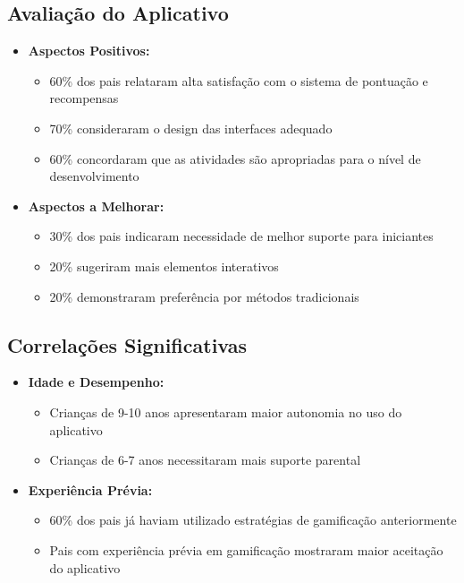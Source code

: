 \subsection{Avaliação do Aplicativo}

\begin{itemize}
    \item \textbf{Aspectos Positivos:}
    \begin{itemize}
        \item 60\% dos pais relataram alta satisfação com o sistema de pontuação e recompensas
        \item 70\% consideraram o design das interfaces adequado
        \item 60\% concordaram que as atividades são apropriadas para o nível de desenvolvimento
    \end{itemize}
    
    \item \textbf{Aspectos a Melhorar:}
    \begin{itemize}
        \item 30\% dos pais indicaram necessidade de melhor suporte para iniciantes
        \item 20\% sugeriram mais elementos interativos
        \item 20\% demonstraram preferência por métodos tradicionais
    \end{itemize}
\end{itemize}

\subsection{Correlações Significativas}

\begin{itemize}
    \item \textbf{Idade e Desempenho:}
    \begin{itemize}
        \item Crianças de 9-10 anos apresentaram maior autonomia no uso do aplicativo
        \item Crianças de 6-7 anos necessitaram mais suporte parental
    \end{itemize}
    
    \item \textbf{Experiência Prévia:}
    \begin{itemize}
        \item 60\% dos pais já haviam utilizado estratégias de gamificação anteriormente
        \item Pais com experiência prévia em gamificação mostraram maior aceitação do aplicativo
    \end{itemize}
\end{itemize}

